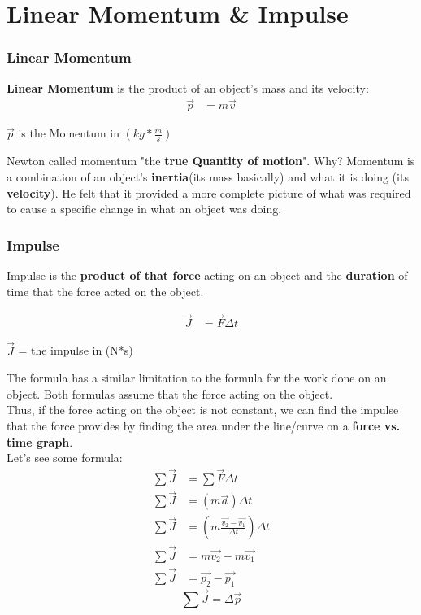 \newpage
\section{Linear Momentum \& Impulse}
\subsubsection{Linear Momentum}
\textbf{Linear Momentum} is the product of an object's mass and its velocity:
\begin{align*}
    \vec{p} &= m\vec{v}
\end{align*}
\begin{center}
    $\vec{p}$ is the Momentum in $(kg * \frac{m}{s})$
\end{center}

Newton called momentum "the \textbf{true Quantity of motion}". Why? Momentum is a combination of an object's 
\textbf{inertia}(its mass basically) and what it is doing (its \textbf{velocity}). He felt that it provided a 
more complete picture of what was required to cause a specific change in what an object was doing. 

\subsubsection{Impulse}
Impulse is the \textbf{product of that force} acting on an object and the \textbf{duration} of time that the 
force acted on the object. 

\begin{align*}
    \vec{J} &= \vec{F}\Delta t
\end{align*}
\begin{center}
    $\vec{J}$ = the impulse in (N*s)
\end{center}

The formula has a similar limitation to the formula for the work done on an object. Both formulas assume that the
force acting on the object. \\

Thus, if the force acting on the object is not constant, we can find the impulse that the force provides by 
finding the area under the line/curve on a \textbf{force vs. time graph}.\\

Let's see some formula:
\begin{align*}
    \sum \vec{J} &= \sum \vec{F}\Delta t\\
    \sum \vec{J} &= (m\vec{a})\Delta t\\
    \sum \vec{J} &= \left(m\frac{\vec{v_2} - \vec{v_1}}{\Delta t}\right)\Delta t\\
    \sum \vec{J} &= m\vec{v_2} - m\vec{v_1}\\
    \sum \vec{J} &= \vec{p_2} - \vec{p_1}
\end{align*}
\begin{equation}
    \sum \vec{J} = \Delta \vec{p}
\end{equation}
